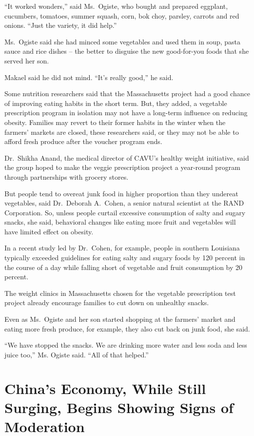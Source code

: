 ﻿\documentclass[12pt]{article}
\begin{document}
``It worked wonders,'' said Ms.~Ogiste, who bought and prepared eggplant, cucumbers, tomatoes,
summer squash, corn, bok choy, parsley, carrots and red onions. ``Just the variety, it did help.''

Ms.~Ogiste said she had minced some vegetables and used them in soup, pasta sauce and rice dishes --
the better to disguise the new good-for-you foods that she served her son.

Makael said he did not mind. ``It's really good,'' he said.

Some nutrition researchers said that the Massachusetts project had a good chance of improving eating
habits in the short term. But, they added, a vegetable prescription program in isolation may not
have a long-term influence on reducing obesity. Families may revert to their former habits in the
winter when the farmers' markets are closed, these researchers said, or they may not be able to
afford fresh produce after the voucher program ends.

Dr.~Shikha Anand, the medical director of CAVU's healthy weight initiative, said the group hoped to
make the veggie prescription project a year-round program through partnerships with grocery stores.

But people tend to overeat junk food in higher proportion than they undereat vegetables, said
Dr.~Deborah A.~Cohen, a senior natural scientist at the RAND Corporation. So, unless people curtail
excessive consumption of salty and sugary snacks, she said, behavioral changes like eating more
fruit and vegetables will have limited effect on obesity.

In a recent study led by Dr.~Cohen, for example, people in southern Louisiana typically exceeded
guidelines for eating salty and sugary foods by 120 percent in the course of a day while falling
short of vegetable and fruit consumption by 20 percent.

The weight clinics in Massachusetts chosen for the vegetable prescription test project already
encourage families to cut down on unhealthy snacks.

Even as Ms.~Ogiste and her son started shopping at the farmers' market and eating more fresh
produce, for example, they also cut back on junk food, she said.

``We have stopped the snacks. We are drinking more water and less soda and less juice too,'' Ms.
Ogiste said. ``All of that helped.''

\section{China's Economy, While Still Surging, Begins Showing Signs of Moderation}
\end{document}

